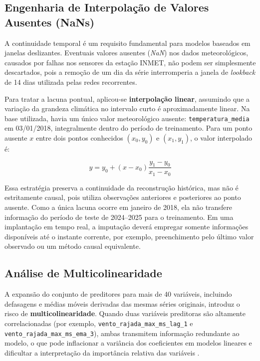 \subsection{Engenharia de Interpolação de Valores Ausentes (NaNs)}
A continuidade temporal é um requisito fundamental para modelos baseados em janelas deslizantes. Eventuais valores ausentes (\textit{NaN}) nos dados meteorológicos, causados por falhas nos sensores da estação INMET, não podem ser simplesmente descartados, pois a remoção de um dia da série interromperia a janela de \textit{lookback} de 14 dias utilizada pelas redes recorrentes.

Para tratar a lacuna pontual, aplicou-se \textbf{interpolação linear}, assumindo que a variação da grandeza climática no intervalo curto é aproximadamente linear. Na base utilizada, havia um único valor meteorológico ausente: \texttt{temperatura\_media} em 03/01/2018, integralmente dentro do período de treinamento. Para um ponto ausente $x$ entre dois pontos conhecidos $(x_0, y_0)$ e $(x_1, y_1)$, o valor interpolado é:

\begin{equation}
    y = y_0 + (x - x_0) \frac{y_1 - y_0}{x_1 - x_0}
\end{equation}

Essa estratégia preserva a continuidade da reconstrução histórica, mas não é estritamente causal, pois utiliza observações anteriores e posteriores ao ponto ausente. Como a única lacuna ocorre em janeiro de 2018, ela não transfere informação do período de teste de 2024--2025 para o treinamento. Em uma implantação em tempo real, a imputação deverá empregar somente informações disponíveis até o instante corrente, por exemplo, preenchimento pelo último valor observado ou um método causal equivalente.

\subsection{Análise de Multicolinearidade}
A expansão do conjunto de preditores para mais de 40 variáveis, incluindo defasagens e médias móveis derivadas das mesmas séries originais, introduz o risco de \textbf{multicolinearidade}. Quando duas variáveis preditoras são altamente correlacionadas (por exemplo, \texttt{vento\_rajada\_max\_ms\_lag\_1} e \texttt{vento\_rajada\_max\_ms\_ema\_3}), ambas transmitem informação redundante ao modelo, o que pode inflacionar a variância dos coeficientes em modelos lineares e dificultar a interpretação da importância relativa das variáveis \cite{hastie2009elements}.

